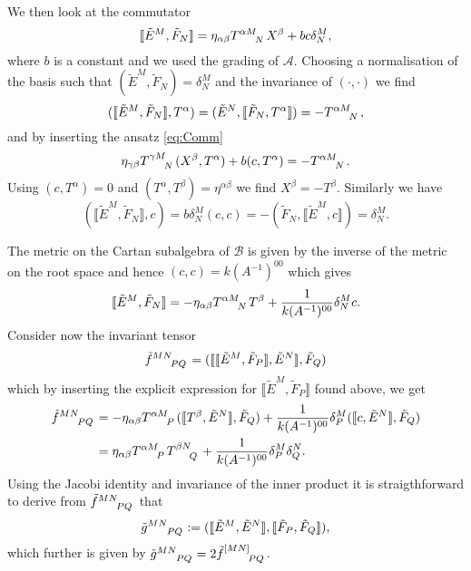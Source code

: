 We then look at the commutator 
\begin{equation}\label{eq:Comm}
    \llbracket \tilde{E}^M,\tilde{F}_N \rrbracket = \eta_{\alpha\beta}\tensor{T}{^{\alpha M}_N}\tensor{X}{^{\beta}}+bc\delta^M_N,
\end{equation}
where $b$ is a constant and we used the grading of $\mathscr{A}$. Choosing a normalisation of the basis such that $(\tilde{E}^M,\tilde{F}_N)=\delta^M_N$ and the invariance of $(\cdot,\cdot)$ we find 
\begin{equation}
    (\llbracket\tilde{E}^M,\tilde{F}_N\rrbracket,T^\alpha) = (\tilde{E}^N,\llbracket\tilde{F}_N,T^\alpha\rrbracket) = -\tensor{T}{^{\alpha M}_N},
\end{equation}
and by inserting the ansatz \eqref{eq:Comm}
\begin{equation}
    \eta_{\gamma\beta}\tensor{T}{^{\gamma M}_N}(X^\beta,T^\alpha)+b(c,T^\alpha) = -\tensor{T}{^{\alpha M}_N}.
\end{equation}
Using $(c,T^\alpha)=0$ and $(T^\alpha,T^\beta)=\eta^{\alpha\beta}$ we find $X^\beta = -T^\beta$. Similarly we have 
\begin{equation}
    (\llbracket\tilde{E}^M,\tilde{F}_N\rrbracket,c) = b\delta^M_N(c,c) = -(\tilde{F}_N,\llbracket \tilde{E}^M,c\rrbracket) = \delta^M_N.
\end{equation}

The metric on the Cartan subalgebra of $\mathscr{B}$ is given by the inverse of the metric on the root space and hence $(c,c)=k(A^{-1})^{00}$ which gives 
\begin{equation}
    \llbracket \tilde{E}^M,\tilde{F}_N\rrbracket = -\eta_{\alpha\beta}\tensor{T}{^{\alpha M}_N}T^\beta+\frac{1}{k(A^{-1})^{00}}\delta^M_Nc.
\end{equation}
Consider now the invariant tensor 
\begin{equation}
    \tensor{\tilde{f}}{^{MN}_{PQ}}=(\llbracket\llbracket\tilde{E}^M,\tilde{F}_P\rrbracket,\tilde{E}^N\rrbracket,\tilde{F}_Q)
\end{equation}
which by inserting the explicit expression for $\llbracket\tilde{E}^M,\tilde{F}_P\rrbracket$ found above, we get 
\begin{equation}
    \begin{aligned}
        \tensor{\tilde{f}}{^{MN}_{PQ}} &= -\eta_{\alpha\beta}\tensor{T}{^{\alpha M}_P}(\llbracket T^\beta,\tilde{E}^N\rrbracket,\tilde{F}_Q)+\frac{1}{k(A^{-1})^{00}}\delta^M_P(\llbracket  c,\tilde{E}^N\rrbracket,\tilde{F}_Q)\\
        & = \eta_{\alpha\beta}\tensor{T}{^{\alpha M}_P}\tensor{T}{^{\beta N}_Q}+\frac{1}{k(A^{-1})^{00}}\delta^M_P\delta^N_Q.
    \end{aligned}
\end{equation}
Using the Jacobi identity and invariance of the inner product it is straigthforward to derive from $\tensor{\tilde{f}}{^{MN}_{PQ}}$ that 
\begin{equation}
    \tensor{\tilde{g}}{^{MN}_{PQ}} := (\llbracket\tilde{E}^M,\tilde{E}^N\rrbracket,\llbracket\tilde{F}_P,\tilde{F}_Q\rrbracket),
\end{equation}
which further is given by $\tensor{\tilde{g}}{^{MN}_{PQ}}=2\tensor{\tilde{f}}{^{[MN]}_{PQ}}$. 

